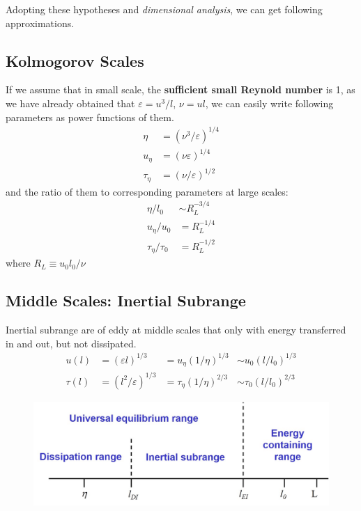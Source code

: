 \documentclass[12pt]{article}
\begin{document}
    Adopting these hypotheses and \emph{dimensional analysis}, we can get following approximations.
    \clearpage
    \subsection{Kolmogorov Scales} %
    \label{sub:kolmogorov_scales}
        If we assume that in small scale, the \textbf{sufficient small Reynold number} is 1, as we have already obtained that $\varepsilon = u^3/l$, $\nu = ul$, we can easily write following parameters as power functions of them.
        \begin{align}
            \eta &= (\nu^3/\varepsilon)^{1/4}\\
            u_{\eta} &= (\nu \varepsilon)^{1/4}\\
            \tau_{\eta} &= (\nu/\varepsilon)^{1/2}
        \end{align}
        and the ratio of them to corresponding parameters at large scales:
        \begin{align}
            \eta/l_0 &\sim R_L^{-3/4}\\
            u_{\eta}/u_0 &= R_L^{-1/4}\\
            \tau_{\eta}/\tau_0 &= R_L^{-1/2}
        \end{align}
        where $R_L\equiv {u_0 l_0}/{\nu}$
    \clearpage
    \subsection{Middle Scales: Inertial Subrange} %
    \label{sub:middle_scales_inertial_subrange}
    Inertial subrange are of eddy at middle scales that only with energy transferred in and out, but not dissipated. 
    \begin{align}
        u(l)&=(\varepsilon l)^{1/3}&=u_\eta(1/\eta)^{1/3}&\sim u_0(l/l_0)^{1/3}\\
        \tau(l) &=(l^2/\varepsilon)^{1/3}&=\tau_\eta(1/\eta)^{2/3}&\sim \tau_0(l/l_0)^{2/3}
    \end{align}
    \begin{figure}[hb]
              \centering
              \includegraphics[totalheight=45 mm]{img/ranges.jpg}
    \end{figure}
    \clearpage
\end{document}
